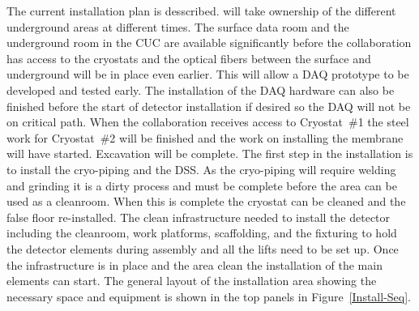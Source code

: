 The current installation plan is desscribed.  will take
ownership of the different underground areas at different times. The
surface data room and the underground room in the CUC are available
significantly before the collaboration has access to the cryostats and
the optical fibers between the surface and underground will be in
place even earlier. This will allow a DAQ prototype to be developed
and tested early. The installation of the DAQ hardware can also be
finished before the start of detector installation if desired so the
DAQ will not be on critical path.  When the collaboration receives
access to Cryostat~\#1 the steel work for Cryostat~\#2 will be
finished and the work on installing the membrane will have
started. Excavation will be complete.  The first step in the
installation is to install the cryo-piping and the DSS. As the
cryo-piping will require welding and grinding it is a dirty process
and must be complete before the area can be used as a cleanroom. When
this is complete the cryostat can be cleaned and the false floor
re-installed. The clean infrastructure needed to install the detector
including the cleanroom, work platforms, scaffolding, and the
fixturing to hold the detector elements during assembly and all the
lifts need to be set up. Once the infrastructure is in place and the area
clean the installation of the main elements can start. The general
layout of the installation area showing the necessary space and
equipment is shown in the top panels in Figure~\ref{Install-Seq}.

